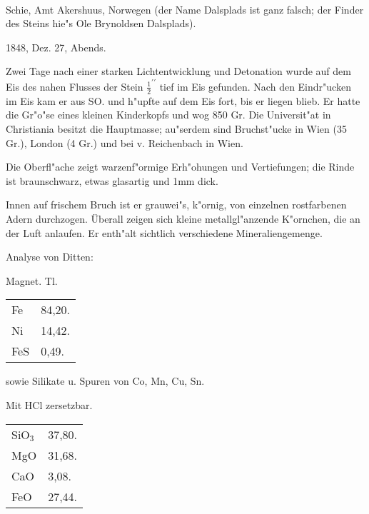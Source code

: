 \documentclass[a4paper, 11pt, oneside]{article}
\begin{document}
\paragraph{}
Schie, Amt Akershuus, Norwegen (der Name Dalsplads ist ganz falsch; der Finder des Steins hie"s Ole Brynoldsen Dalsplads).

1848, Dez. 27, Abends.

Zwei Tage nach einer starken Lichtentwicklung und Detonation wurde auf dem Eis des nahen Flusses der Stein $\frac{1}{2}^{\prime\prime}$ tief im Eis gefunden. Nach den Eindr"ucken im Eis kam er aus SO. und h"upfte auf dem Eis fort, bis er liegen blieb. Er hatte die Gr"o"se eines kleinen Kinderkopfs und wog 850 Gr. Die Universit"at in Christiania besitzt die Hauptmasse; au"serdem sind Bruchst"ucke in Wien (35 Gr.), London (4 Gr.) und bei v. Reichenbach in Wien.

Die Oberfl"ache zeigt warzenf"ormige Erh"ohungen und Vertiefungen; die Rinde ist braunschwarz, etwas glasartig und 1mm dick.

Innen auf frischem Bruch ist er grauwei"s, k"ornig, von einzelnen rostfarbenen Adern durchzogen. Überall zeigen sich kleine metallgl"anzende K"ornchen, die an der Luft anlaufen. Er enth"alt sichtlich verschiedene Mineraliengemenge.

Analyse von Ditten:
\begin{center}
Magnet. Tl. 
\end{center}

\begin{table}[H]
    \centering
    \begin{tabular}{l l}
        Fe & 84,20. \\
        Ni & 14,42. \\
        FeS & 0,49. \\
    \end{tabular}
\end{table}

sowie Silikate u. Spuren von Co, Mn, Cu, Sn.

\begin{center}
Mit HCl zersetzbar.
\end{center}

\begin{table}[H]
    \centering
    \begin{tabular}{l l}
        SiO$_{3}$ & 37,80. \\
        MgO & 31,68. \\
        CaO & 3,08. \\
        FeO & 27,44. \\ 
    \end{tabular}
\end{table}
 
\end{document}
